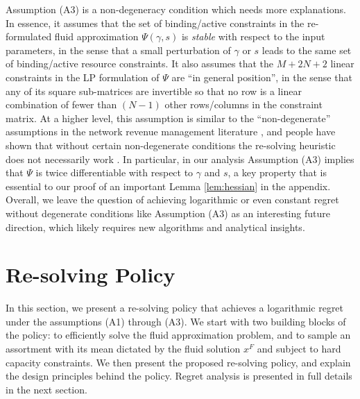 \documentclass[opre]{informs3aa}
\begin{document}
Assumption (A3) is a non-degeneracy condition which needs more explanations.
In essence, it assumes that the set of binding/active constraints in the re-formulated fluid approximation $\Psi(\gamma,s)$ is \emph{stable}
with respect to the input parameters, in the sense that a small perturbation of $\gamma$ or $s$ leads to the same set of binding/active resource constraints.
It also assumes that the $M+ 2N + 2$ linear constraints in the LP formulation of $\Psi$ are ``in general position'', in the sense that any of its square sub-matrices are invertible
so that no row is a linear combination of fewer than $(N-1)$ other rows/columns in the constraint matrix.
At a higher level, this assumption is similar to the ``non-degenerate'' assumptions in the network revenue management literature \citep{jasin2012re,Wang2020resolve,wu2015algorithms}, and people have shown that without certain non-degenerate conditions the re-solving heuristic does not
necessarily work \citep{cooper2002asymptotic}. 
{
In particular, in our analysis Assumption (A3) implies that $\Psi$ is twice differentiable with respect to $\gamma$ and $s$, a key property
that is essential to our proof of an important Lemma \ref{lem:hessian} in the appendix.
}
Overall, we leave the question of achieving logarithmic or even constant regret without degenerate conditions 
like Assumption (A3) as an interesting future direction, which likely requires new algorithms and analytical insights.


\section{Re-solving Policy}
\label{sec:policy}

In this section, we present a re-solving policy that achieves a logarithmic regret under the assumptions (A1) through (A3).
We start with two building blocks of the policy: to efficiently solve the fluid approximation problem,
and to sample an assortment with its mean dictated by the fluid solution $x^F$ and subject to hard capacity constraints.
We then present the proposed re-solving policy, and explain the design principles behind the policy.
Regret analysis is presented in full details in the next section.
\end{document}
